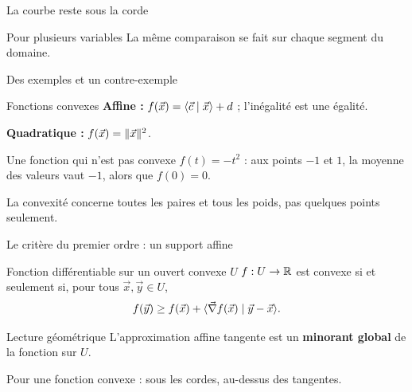 \begin{frame}[t]{La courbe reste sous la corde}
\coursanalyse
\begin{center}\end{center}
\begin{resultat}{Pour plusieurs variables}
La même comparaison se fait sur chaque segment du domaine.
\end{resultat}
\end{frame}

\begin{frame}[t]{Des exemples et un contre-exemple}
\coursanalyse
\begin{exemple}{Fonctions convexes}
\textbf{Affine :} $f(\vec x)=\langle \vec c\mid \vec x\rangle+d$ ; l'inégalité est une égalité.

\medskip
\textbf{Quadratique :} $f(\vec x)=\lVert \vec x\rVert^2$.
\end{exemple}
\begin{exemple}{Une fonction qui n’est pas convexe}
$f(t)=-t^2$ : aux points $-1$ et $1$, la moyenne des valeurs vaut $-1$, alors que $f(0)=0$.
\end{exemple}
\vfill La convexité concerne toutes les paires et tous les poids, pas quelques points seulement.
\end{frame}

\begin{frame}[t]{Le critère du premier ordre : un support affine}
\coursanalyse
\begin{theoreme}{Fonction différentiable sur un ouvert convexe $U$}
$f:U\to\mathbb R$ est convexe si et seulement si, pour tous $\vec x,\vec y\in U$,
\[f(\vec y)\ge f(\vec x)+\langle \vec\nabla f(\vec x)\mid \vec y-\vec x\rangle.\]
\end{theoreme}
\begin{resultat}{Lecture géométrique}
L'approximation affine tangente est un \textbf{minorant global} de la fonction sur $U$.
\end{resultat}
\vfill Pour une fonction convexe : sous les cordes, au-dessus des tangentes.
\end{frame}

